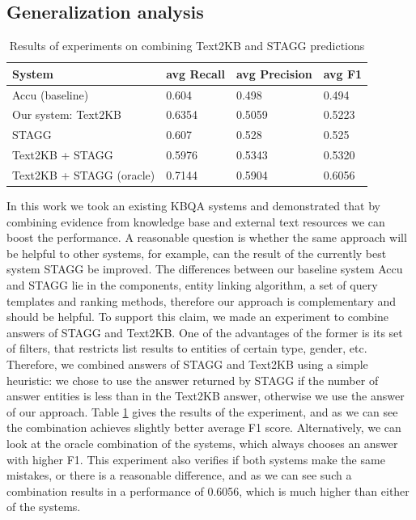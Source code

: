 
\subsection{Generalization analysis}


\begin{table}
\centering
\caption{Results of experiments on combining Text2KB and STAGG predictions}
\label{table:combine_stagg}
\begin{tabular}{| p{4cm} | p{1cm} | p{1cm} | p{1cm} | }
\hline
System & avg Recall & avg Precision & avg F1 \\
\hline
Accu (baseline) \cite{ACCU:2015} & 0.604 & 0.498 & 0.494\\
Our system: Text2KB & 0.6354 & 0.5059 & 0.5223 \\
STAGG \cite{yih2015semantic} & 0.607 & 0.528 & 0.525\\
\hline
Text2KB + STAGG & 0.5976 & 0.5343 & 0.5320 \\
Text2KB + STAGG (oracle) & 0.7144 & 0.5904 & 0.6056 \\
\hline
\end{tabular}
\end{table}

In this work we took an existing KBQA systems and demonstrated that by combining evidence from knowledge base and external text resources we can boost the performance.
A reasonable question is whether the same approach will be helpful to other systems, \eg for example, can the result of the currently best system STAGG \cite{yih2015semantic} be improved.
The differences between our baseline system Accu and STAGG lie in the components, \ie entity linking algorithm, a set of query templates and ranking methods, therefore our approach is complementary and should be helpful.
To support this claim, we made an experiment to combine answers of STAGG and Text2KB.
One of the advantages of the former is its set of filters, that restricts list results to entities of certain type, gender, etc.
Therefore, we combined answers of STAGG and Text2KB using a simple heuristic: we chose to use the answer returned by STAGG if the number of answer entities is less than in the Text2KB answer, otherwise we use the answer of our approach.
Table \ref{table:combine_stagg} gives the results of the experiment, and as we can see the combination achieves slightly better average F1 score.
Alternatively, we can look at the oracle combination of the systems, which always chooses an answer with higher F1.
This experiment also verifies if both systems make the same mistakes, or there is a reasonable difference, and as we can see such a combination results in a performance of 0.6056, which is much higher than either of the systems.

